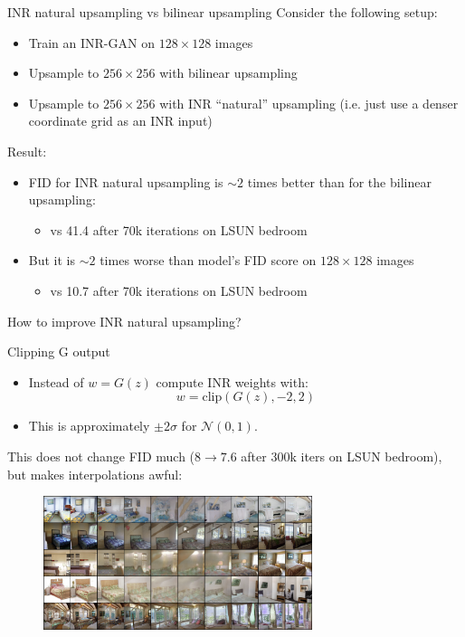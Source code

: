 \documentclass[10pt, handout]{beamer}
\begin{document}
\begin{frame}{INR natural upsampling vs bilinear upsampling}
Consider the following setup:
\begin{itemize}
    \item\pause Train an INR-GAN on $128\times 128$ images
    \item\pause Upsample to $256 \times 256$ with bilinear upsampling
    \item\pause Upsample to $256 \times 256$ with INR ``natural'' upsampling (i.e. just use a denser coordinate grid as an INR input)
\end{itemize}

\pause
Result:
\begin{itemize}
    \item\pause FID for INR natural upsampling is $\sim 2$ times better than for the bilinear upsampling:
    \begin{itemize}
        \item{} vs 41.4 after 70k iterations on LSUN bedroom
    \end{itemize}
    \item\pause But it is $\sim 2$ times worse than model's FID score on $128\times 128$ images
    \begin{itemize}
        \item{} vs 10.7 after 70k iterations on LSUN bedroom
    \end{itemize}
\end{itemize}

How to improve INR natural upsampling?
\end{frame}


\begin{frame}{Clipping G output}
\pause
\begin{itemize}
    \item\pause Instead of $w = G(z)$ compute INR weights with:
    $$w = \text{clip}(G(z), -2, 2)$$
    \item\pause This is approximately $\pm 2\sigma$ for $\mathcal{N}(0,1)$. 
\end{itemize}

\pause This does not change FID much ($8 \to 7.6$ after 300k iters on LSUN bedroom), but makes interpolations awful:
\begin{figure}
\centering
\includegraphics[width=0.7\textwidth]{images/normal_clip_lerp.png}
\end{figure}
\end{frame}
\end{document}
